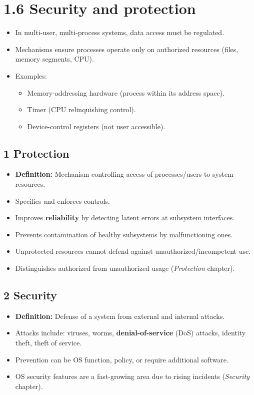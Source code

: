 \documentclass{article}
\begin{document}
\newpage
\section*{1.6 Security and protection}
\begin{itemize}
    \item In multi-user, multi-process systems, data access must be regulated.
    \item Mechanisms ensure processes operate only on authorized resources (files, memory segments, CPU).
    \item Examples:
    \begin{itemize}
        \item Memory-addressing hardware (process within its address space).
        \item Timer (CPU relinquishing control).
        \item Device-control registers (not user accessible).
    \end{itemize}
\end{itemize}

\subsection*{1 Protection}
\begin{itemize}
    \item \textbf{Definition:} Mechanism controlling access of processes/users to system resources.
    \item Specifies and enforces controls.
    \item Improves \textbf{reliability} by detecting latent errors at subsystem interfaces.
    \item Prevents contamination of healthy subsystems by malfunctioning ones.
    \item Unprotected resources cannot defend against unauthorized/incompetent use.
    \item Distinguishes authorized from unauthorized usage (\textit{Protection} chapter).
\end{itemize}

\subsection*{2 Security}
\begin{itemize}
    \item \textbf{Definition:} Defense of a system from external and internal attacks.
    \item Attacks include: viruses, worms, \textbf{denial-of-service} (DoS) attacks, identity theft, theft of service.
    \item Prevention can be OS function, policy, or require additional software.
    \item OS security features are a fast-growing area due to rising incidents (\textit{Security} chapter).
\end{itemize}
\end{document}
